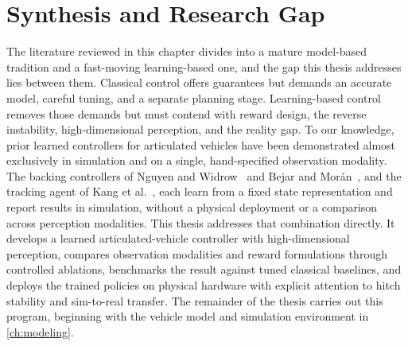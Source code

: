 \section{Synthesis and Research Gap}

The literature reviewed in this chapter divides into a mature model-based tradition and a fast-moving learning-based one, and the gap this thesis addresses lies between them. Classical control offers guarantees but demands an accurate model, careful tuning, and a separate planning stage. Learning-based control removes those demands but must contend with reward design, the reverse instability, high-dimensional perception, and the reality gap. To our knowledge, prior learned controllers for articulated vehicles have been demonstrated almost exclusively in simulation and on a single, hand-specified observation modality. The backing controllers of Nguyen and Widrow~\cite{nguyen1990truck} and Bejar and Mor\'an~\cite{bejar2018backing}, and the tracking agent of Kang et al.~\cite{kang2024tractortrailer}, each learn from a fixed state representation and report results in simulation, without a physical deployment or a comparison across perception modalities. This thesis addresses that combination directly. It develops a learned articulated-vehicle controller with high-dimensional perception, compares observation modalities and reward formulations through controlled ablations, benchmarks the result against tuned classical baselines, and deploys the trained policies on physical hardware with explicit attention to hitch stability and sim-to-real transfer. The remainder of the thesis carries out this program, beginning with the vehicle model and simulation environment in \cref{ch:modeling}.
